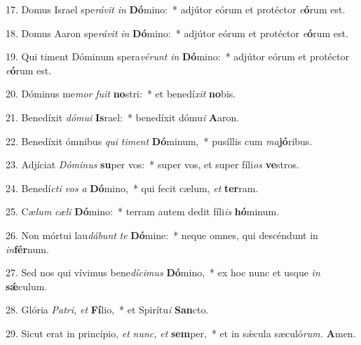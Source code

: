 \item 17. Domus Israel spe\hspace{0.03em}\textit{rávit} \textit{in} \textbf{Dó}mino:~* adjútor eórum et protéctor \textit{e}\textbf{ó}rum est.
\item 18. Domus Aaron spe\hspace{0.03em}\textit{rávit} \textit{in} \textbf{Dó}mino:~* adjútor eórum et protéctor \textit{e}\textbf{ó}rum est.
\item 19. Qui timent Dóminum spera\hspace{0.03em}\textit{vérunt} \textit{in} \textbf{Dó}mino:~* adjútor eórum et protéctor \textit{e}\textbf{ó}rum est.
\item 20. Dóminus me\hspace{0.03em}\textit{mor} \textit{fuit} \textbf{no}stri:~* et benedí\textit{xit} \textbf{no}bis.
\item 21. Benedíxit \textit{dómui} \textbf{Is}rael:~* benedíxit dómu\textit{i} \textbf{A}aron.
\item 22. Benedíxit ómnibus \textit{qui} \textit{timent} \textbf{Dó}minum,~* pusíllis cum \textit{ma}\textbf{jó}ribus.
\item 23. Adjíciat \textit{Dóminus} \textbf{su}per vos:~* super vos, et super fíli\textit{os} \textbf{ve}stros.
\item 24. Benedí\hspace{0.03em}\textit{cti} \textit{vos} \textit{a} \textbf{Dó}mino,~* qui fecit cælum, \textit{et} \textbf{ter}ram.
\item 25. Cæ\hspace{0.03em}\textit{lum} \textit{cæli} \textbf{Dó}mino:~* terram autem dedit fíli\textit{is} \textbf{hó}minum.
\item 26. Non mórtui lau\hspace{0.03em}\textit{dábunt} \textit{te} \textbf{Dó}mine:~* neque omnes, qui descéndunt in \textit{in}\textbf{fér}num.
\item 27. Sed nos qui vívimus bene\hspace{0.03em}\hspace{0.03em}\textit{dícimus} \textbf{Dó}mino,~* ex hoc nunc et usque \textit{in} \textbf{sǽ}culum.
\item 28. Glória \textit{Patri,} \textit{et} \textbf{Fí}lio,~* et Spirítu\hspace{0.03em}\textit{i} \textbf{San}cto.
\item 29. Sicut erat in princípio, \textit{et} \textit{nunc,} \textit{et} \textbf{sem}per,~* et in sǽcula sæculó\textit{rum.} \textbf{A}men.
